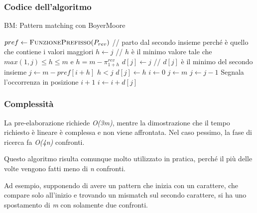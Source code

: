 
\subsubsection{Codice dell'algoritmo}\label{codice-dellalgoritmo}


\begin{breakablealgorithm}
	\caption{BM: Pattern matching con BoyerMoore}
	\begin{algorithmic}[1]
	    \State $ pref \gets \text{\textsc{FunzionePrefisso}}(P_{rev}) $
	    \State // parto dal secondo insieme perché è quello che contiene i valori maggiori
	            \State $ h \gets j $
	        \EndIf
	        \State // $ h $ è il minimo valore tale che $ max(1,j) \leq h \leq m $ e $ h = m -\pi_{1+h}^{rev} $
	        \State $ d[j] \gets j $
	    \EndFor
	    \State // $ d[j] $ è il minimo del secondo insieme
	        \State $ j \gets m - pref[i+h] $
	        \If $  h < j $
	            \State $ d[j] \gets h  $
	       \EndIf
	    \EndFor
	    \State $ i \gets 0 $
	        \State $ j \gets m $
	           \State $ j \gets j - 1 $
	        \EndWhile
	            \State Segnala l'occorrenza in posizione $ i + 1 $
	        \EndIf
	        \State $ i \gets i + d[j] $
	      \EndWhile
	  \EndFunction
	  \end{algorithmic}
\end{breakablealgorithm}

\subsubsection{Complessità}\label{complessituxe0}

La pre-elaborazione richiede \emph{O(3m)}, mentre la dimostrazione che il
tempo richiesto è lineare è complessa e non viene affrontata. Nel caso
pessimo, la fase di ricerca fa \emph{O(4n)} confronti.

Questo algoritmo risulta comunque molto utilizzato in pratica, perché il
più delle volte vengono fatti meno di \emph{n} confronti.

Ad esempio, supponendo di avere un pattern che inizia con un carattere,
che compare solo all'inizio e trovando un mismatch sul secondo
carattere, si ha uno spostamento di \emph{m} con solamente due
confronti.

